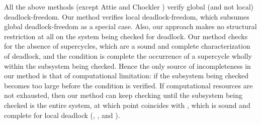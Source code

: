 All the above methods (except Attie and Chockler \cite{AC05}) verify global (and not
local) deadlock-freedom.  Our method verifies local deadlock-freedom, which subsumes 
global deadlock-freedom as a special case.
Also, our approach makes no
structural restriction at all on the system being checked for deadlock.  Our method checks
for the absence of supercycles, which are a sound and complete characterization of
deadlock, and the \LAO condition is complete \wrt the occurrence of a supercycle wholly
within the subsystem being checked. 
Hence the only source of incompleteness in our method is that of computational
limitation: if the subsystem being checked becomes too large before 
the \LAO condition is verified. If computational resources are not exhausted, then our
method can keep checking until the subsystem being checked is the entire system, at which
point \LAO coincides with \GAO, which is sound and complete for local deadlock
(, , and ).






